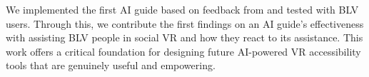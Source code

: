 We implemented the first AI guide based on feedback from and tested with BLV users. Through this, we contribute the first findings on an AI guide’s effectiveness with assisting BLV people in social VR and how they react to its assistance. This work offers a critical foundation for designing future AI-powered VR accessibility tools that are genuinely useful and empowering.
